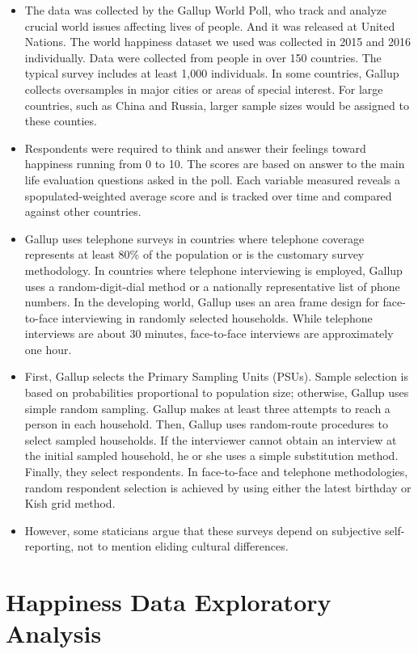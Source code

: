 \documentclass[11pt]{article}
\begin{document}
\begin{itemize}
\item
  The data was collected by the Gallup World Poll, who track and analyze
  crucial world issues affecting lives of people. And it was released at
  United Nations. The world happiness dataset we used was collected in
  2015 and 2016 individually. Data were collected from people in over
  150 countries. The typical survey includes at least 1,000 individuals.
  In some countries, Gallup collects oversamples in major cities or
  areas of special interest. For large countries, such as China and
  Russia, larger sample sizes would be assigned to these counties.
\item
  Respondents were required to think and answer their feelings toward
  happiness running from 0 to 10. The scores are based on answer to the
  main life evaluation questions asked in the poll. Each variable
  measured reveals a spopulated-weighted average score and is tracked
  over time and compared against other countries.
\item
  Gallup uses telephone surveys in countries where telephone coverage
  represents at least 80\% of the population or is the customary survey
  methodology. In countries where telephone interviewing is employed,
  Gallup uses a random-digit-dial method or a nationally representative
  list of phone numbers. In the developing world, Gallup uses an area
  frame design for face-to-face interviewing in randomly selected
  households. While telephone interviews are about 30 minutes,
  face-to-face interviews are approximately one hour.
\item
  First, Gallup selects the Primary Sampling Units (PSUs). Sample
  selection is based on probabilities proportional to population size;
  otherwise, Gallup uses simple random sampling. Gallup makes at least
  three attempts to reach a person in each household. Then, Gallup uses
  random-route procedures to select sampled households. If the
  interviewer cannot obtain an interview at the initial sampled
  household, he or she uses a simple substitution method. Finally, they
  select respondents. In face-to-face and telephone methodologies,
  random respondent selection is achieved by using either the latest
  birthday or Kish grid method.
\item
  However, some staticians argue that these surveys depend on subjective
  self-reporting, not to mention eliding cultural differences.
\end{itemize}

    \section{Happiness Data Exploratory
Analysis}\label{happiness-data-exploratory-analysis}
\end{document}
